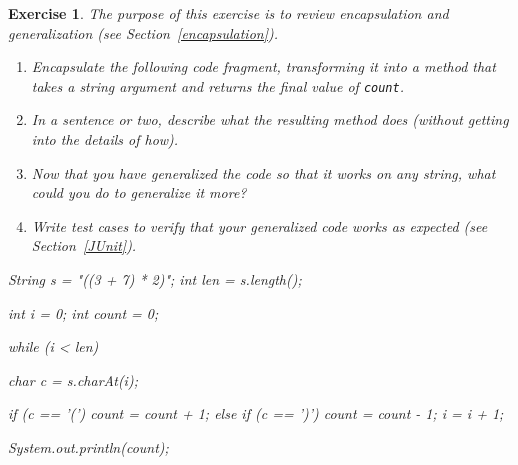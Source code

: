 \documentclass[12pt]{book}
\theoremstyle{exercise}
\newtheorem{exercise}{Exercise}[chapter]
\newcommand{\java}[1]{\verb"#1"}
\newcommand{\java}[1]{\lstinline{#1}} %
\begin{document}
\begin{exercise}

The purpose of this exercise is to review encapsulation and generalization (see Section~\ref{encapsulation}).

\begin{enumerate}

\item Encapsulate the following code fragment, transforming it into a method that takes a string argument and returns the final value of \java{count}.

\item In a sentence or two, describe what the resulting method does (without getting into the details of how).

\item Now that you have generalized the code so that it works on any string, what could you do to generalize it more?

\item Write test cases to verify that your generalized code works as expected (see Section~\ref{JUnit}).

\end{enumerate}

\begin{code}
    String s = "((3 + 7) * 2)";
    int len = s.length();

    int i = 0;
    int count = 0;

    while (i < len) {
        char c = s.charAt(i);

        if (c == '(') {
            count = count + 1;
        } else if (c == ')') {
            count = count - 1;
        }
        i = i + 1;
    }

    System.out.println(count);
\end{code}

\end{exercise}
\end{document}
